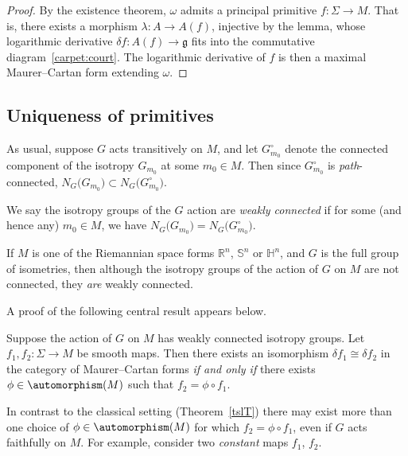\begin{proof} By the existence theorem, $\omega $ admits a principal
 primitive $f \colon\! \Sigma \rightarrow M$. That is, there exists a
 morphism $\lambda \colon\! A \rightarrow A(f)$, injective by the
 lemma, whose logarithmic derivative
 $\delta f \colon\! A(f) \rightarrow {\mathfrak g} $ fits into the
 commutative diagram~\eqref{carpet:court}. The logarithmic
 derivative of $f$ is then a maximal Maurer--Cartan form extending
 $\omega $.
\end{proof}

\subsection*{Uniqueness of primitives}%

As usual, suppose $G$ acts transitively on $M$, and let
$G_{m_0}^\circ $ denote the connected component of the isotropy
$G_{m_0}$ at some $m_0 \in M$. Then since $G_{m_0}^\circ$ is {\em
 path}-connected, $N_G\big(G_{m_0}\big)\subset N_G\big(G_{m_0}^\circ\big)$.
\begin{Definition}%
 We say the isotropy groups of the $G$ action are {\it weakly
 connected} if for some (and hence any) $m_0 \in M$, we have
 $N_G\big(G_{m_0}\big)=N_G\big(G_{m_0}^\circ\big)$.
\end{Definition}

\begin{Example} If $M $ is one of the Riemannian space forms ${\mathbb
R}^n$, ${\mathbb S}^n$ or ${\mathbb H}^n $, and $G$ is the full group of
isometries, then although the isotropy groups of the action of $G$ on
$M$ are not connected, they {\em are} weakly connected.
\end{Example}
A proof of the following central result appears below.

\begin{Theorem}\label{uniquenessT}
 Suppose the action of $G$ on $M$ has weakly connected isotropy
 groups. Let $f_1, f_2 \colon \Sigma \rightarrow M$ be smooth
 maps. Then there exists an isomorphism $\delta f_1 \cong \delta f_2$
 in the category of Maurer--Cartan forms {\em if and only if} there
 exists $\phi \in \automorphism(M)$ such that
 $f_2 = \phi \circ f_1$.
\end{Theorem}

In contrast to the classical setting (Theorem~\ref{tslT})
there may exist more than one choice of $\phi \in \automorphism(M)$
for which $f_2 = \phi \circ f_1$, even if $G$ acts faithfully on
$M$. For example, consider two {\em constant} maps $f_1$, $f_2$.

